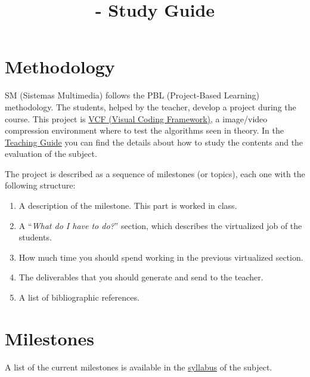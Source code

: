 

\title{\SM{} - Study Guide}

\maketitle

\section{Methodology}
SM (Sistemas Multimedia) follows the PBL (Project-Based Learning)
methodology. The students, helped by the teacher, develop a project
during the course. This project is
\href{https://github.com/Sistemas-Multimedia/VCF}{VCF (Visual Coding Framework)}, a image/video
compression environment where to test the algorithms seen in theory. In the
\href{https://www.ual.es/estudios/masteres/presentacion/plandeestudios/asignatura/7114/71142105}{Teaching
  Guide} you can find the details about how to study the contents and
  the evaluation of the subject.

The project is described as a sequence of milestones (or topics), each
one with the following structure:
\begin{enumerate}
\item A description of the milestone. This part is worked in class.
\item A ``\emph{What do I have to do?}'' section, which describes the
  virtualized job of the students.
\item How much time you should spend working in the previous
  virtualized section.
\item The deliverables that you should generate and send to the
  teacher.
\item A list of bibliographic references.
\end{enumerate}

\section{Milestones}
A list of the current milestones is available in the
\href{https://sistemas-multimedia.github.io/syllabus}{syllabus} of the
subject.

